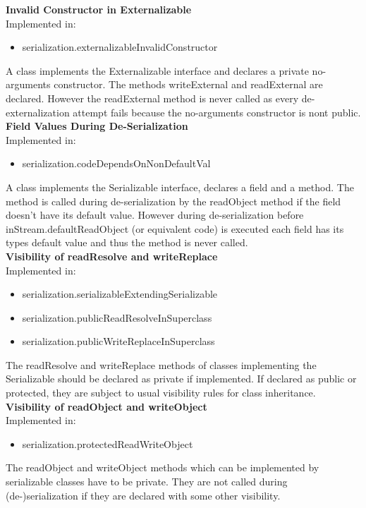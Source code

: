 \documentclass{article}
\begin{document}
\noindent
\textbf{Invalid Constructor in Externalizable}\\
Implemented in: 
\begin{itemize}
    \item serialization.externalizableInvalidConstructor
\end{itemize}
A class implements the Externalizable interface and declares a private no-arguments constructor. The methods writeExternal and readExternal are declared. However the readExternal method is never called as every de-externalization attempt fails because the no-arguments constructor is nont public.\\

\noindent
\textbf{Field Values During De-Serialization}\\
Implemented in: 
\begin{itemize}
    \item serialization.codeDependsOnNonDefaultVal
\end{itemize}
A class implements the Serializable interface, declares a field and a method. The method is called during de-serialization by the readObject method if the field doesn't have its default value. However during de-serialization before inStream.defaultReadObject (or equivalent code) is executed each field has its types default value and thus the method is never called.\\

\noindent
\textbf{Visibility of readResolve and writeReplace}\\
Implemented in: 
\begin{itemize}
    \item serialization.serializableExtendingSerializable
    \item serialization.publicReadResolveInSuperclass
    \item serialization.publicWriteReplaceInSuperclass
\end{itemize}
The readResolve and writeReplace methods of classes implementing the Serializable should be declared as private if implemented. If declared as public or protected, they are subject to usual visibility rules for class inheritance.\\

\noindent
\textbf{Visibility of readObject and writeObject}\\
Implemented in: 
\begin{itemize}
    \item serialization.protectedReadWriteObject
\end{itemize}
The readObject and writeObject methods which can be implemented by serializable classes have to be private. They are not called during (de-)serialization if they are declared with some other visibility.\\
\end{document}
